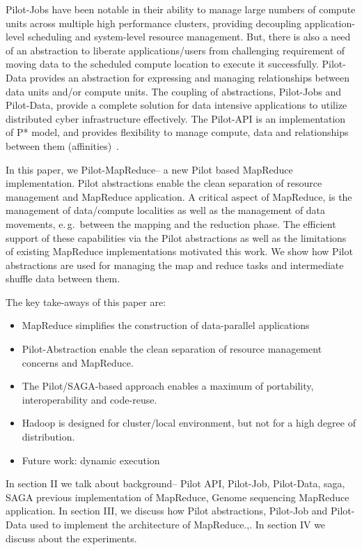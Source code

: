 \documentclass{acm_proc_article-sp}
\newcommand{\pilot}{Pilot\xspace}
\newcommand{\pilotmapreduce}{Pilot-MapReduce\xspace}
\begin{document}
Pilot-Jobs have been notable in their ability to manage large numbers of
compute units across multiple high performance clusters, providing decoupling
application-level scheduling and system-level resource management. But, there
is also a need of an abstraction to liberate applications/users from
challenging requirement of moving data to the scheduled compute location to
execute it successfully. Pilot-Data provides an abstraction for expressing and
managing relationships between data units and/or compute units. The coupling
of abstractions, Pilot-Jobs and Pilot-Data, provide a complete solution for
data intensive applications to utilize distributed cyber infrastructure
effectively. The Pilot-API is an implementation of P* model, and provides
flexibility to manage compute, data and relationships between them
(affinities)~\cite{pstar-2012}.


In this paper, we \pilotmapreduce -- a new \pilot based MapReduce
implementation. \pilot abstractions enable the clean separation of resource
management and MapReduce application. A critical aspect of MapReduce, is the
management of data/compute localities as well as the management of data
movements, e.\,g.\ between the mapping and the reduction phase. The efficient
support of these capabilities via the \pilot abstractions as well as the
limitations of existing MapReduce implementations motivated this work. We show
how \pilot abstractions are used for managing the map and reduce tasks and
intermediate shuffle data between them.

The key take-aways of this paper are:
\begin{itemize}
	\item MapReduce simplifies the construction of data-parallel applications
	\item Pilot-Abstraction enable the clean separation of resource management concerns and MapReduce.
	\item The Pilot/SAGA-based approach enables a maximum of portability, interoperability and code-reuse.
	\item Hadoop is designed for cluster/local environment, but not for a high degree of distribution.
	\item Future work: dynamic execution
\end{itemize}

In section II we talk about background-- Pilot API, Pilot-Job, Pilot-Data,
saga, SAGA previous implementation of MapReduce, Genome sequencing MapReduce
application. In section III, we discuss how Pilot abstractions, Pilot-Job and
Pilot-Data used to implement the architecture of MapReduce.,. In section IV we
discuss about the experiments.
\end{document}
